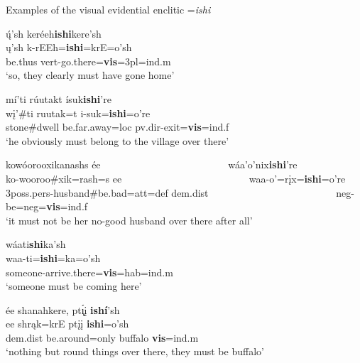 \begin{exe}

\item\label{visualevidential} Examples of the visual evidential enclitic =\textit{ishi}

	\begin{xlist}
	
	\item\label{visualevidential1}
	\glll ų́'sh keréeh\textbf{ishi}kere'sh\\
	ų'sh k-rEEh=\textbf{ishi}=krE=o'sh\\
	\textnormal{be.thus} vert-\textnormal{go.there}=\textbf{vis}=3pl=ind.m\\
	\glt `so, they clearly must have gone home' \citep[265]{hollow1973b}

	\item\label{visualevidential2}
	\glll mí'ti rúutakt ísuk\textbf{ishi}'re\\
	wį'\#ti ruutak=t i-suk=\textbf{ishi}=o're\\
	\textnormal{stone}\#\textnormal{dwell} \textnormal{be.far.away}=loc pv.dir-\textnormal{exit}=\textbf{vis}=ind.f\\
	\glt `he obviously must belong to the village over there' \citep[157]{hollow1973b}

	\item\label{visualevidential3}
	\glll kowóorooxikanashs ée ~ ~ ~ ~ ~ ~ ~ ~ ~ ~ ~ ~ ~ ~ ~ wáa'o'nix\textbf{ishi}'re\\
	ko-wooroo\#xik=rash=s ee ~ ~ ~ ~ ~ ~ ~ ~ ~ ~ ~ ~ ~ ~ ~ waa-o'=rįx=\textbf{ishi}=o're\\
	3poss.pers-\textnormal{husband}\#\textnormal{be.bad}=att=def dem.dist ~ ~ ~ ~ ~ ~ ~ ~ ~ ~ ~ ~ ~ ~ ~ neg-\textnormal{be}=neg=\textbf{vis}=ind.f\\
	\glt `it must not be her no-good husband over there after all' \citep[133]{hollow1973a}

	\item\label{visualevidential4}
	\glll wáati\textbf{shi}ka'sh\\
	waa-ti=\textbf{ishi}=ka=o'sh\\
	\textnormal{someone}-\textnormal{arrive.there}=\textbf{vis}=hab=ind.m\\
	\glt `someone must be coming here' \citep[142]{hollow1973a}

	\item\label{visualevidential5}
	\glll ée shanahkere, pt\'{ı̨}į \textbf{ishí}'sh\\
	ee shrąk=krE ptįį \textbf{ishi}=o'sh\\
	dem.dist \textnormal{be.around}=\textnormal{only} \textnormal{buffalo} \textbf{vis}=ind.m\\
	\glt `nothing but round things over there, they must be buffalo' \citep[212]{hollow1973b}

	
	
	\end{xlist}

\end{exe}

